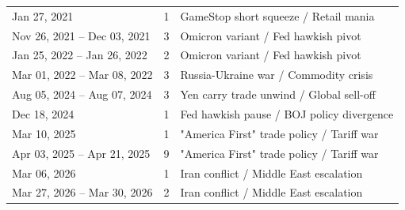 \documentclass[10pt]{article}
\begin{document}
\begin{longtable}{l r p{8cm}}
  Jan 27, 2021 & 1 & GameStop short squeeze / Retail mania \\
  Nov 26, 2021 -- Dec 03, 2021 & 3 & Omicron variant / Fed hawkish pivot \\
  Jan 25, 2022 -- Jan 26, 2022 & 2 & Omicron variant / Fed hawkish pivot \\
  Mar 01, 2022 -- Mar 08, 2022 & 3 & Russia-Ukraine war / Commodity crisis \\
  Aug 05, 2024 -- Aug 07, 2024 & 3 & Yen carry trade unwind / Global sell-off \\
  Dec 18, 2024 & 1 & Fed hawkish pause / BOJ policy divergence \\
  Mar 10, 2025 & 1 & "America First" trade policy / Tariff war \\
  Apr 03, 2025 -- Apr 21, 2025 & 9 & "America First" trade policy / Tariff war \\
  Mar 06, 2026 & 1 & Iran conflict / Middle East escalation \\
  Mar 27, 2026 -- Mar 30, 2026 & 2 & Iran conflict / Middle East escalation \\
\end{longtable}
\end{document}
